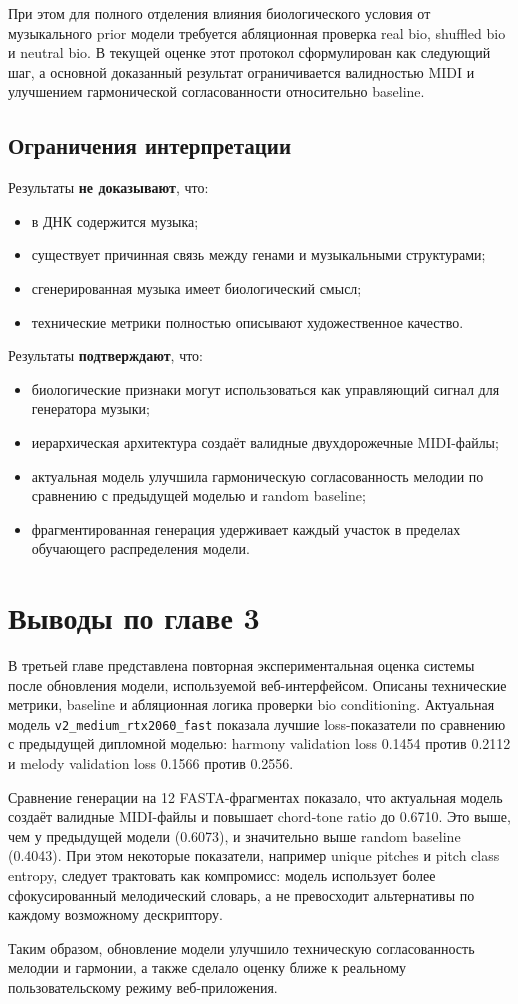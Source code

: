 При этом для полного отделения влияния биологического условия от музыкального prior модели требуется абляционная проверка real bio, shuffled bio и neutral bio. В текущей оценке этот протокол сформулирован как следующий шаг, а основной доказанный результат ограничивается валидностью MIDI и улучшением гармонической согласованности относительно baseline.

\subsection{Ограничения интерпретации}

Результаты \textbf{не доказывают}, что:
\begin{itemize}
\item в ДНК содержится музыка;
\item существует причинная связь между генами и музыкальными структурами;
\item сгенерированная музыка имеет биологический смысл;
\item технические метрики полностью описывают художественное качество.
\end{itemize}

Результаты \textbf{подтверждают}, что:
\begin{itemize}
\item биологические признаки могут использоваться как управляющий сигнал для генератора музыки;
\item иерархическая архитектура создаёт валидные двухдорожечные MIDI-файлы;
\item актуальная модель улучшила гармоническую согласованность мелодии по сравнению с предыдущей моделью и random baseline;
\item фрагментированная генерация удерживает каждый участок в пределах обучающего распределения модели.
\end{itemize}

\section*{Выводы по главе 3}

В третьей главе представлена повторная экспериментальная оценка системы после обновления модели, используемой веб-интерфейсом. Описаны технические метрики, baseline и абляционная логика проверки bio conditioning. Актуальная модель \texttt{v2\_medium\_rtx2060\_fast} показала лучшие loss-показатели по сравнению с предыдущей дипломной моделью: harmony validation loss 0.1454 против 0.2112 и melody validation loss 0.1566 против 0.2556.

Сравнение генерации на 12 FASTA-фрагментах показало, что актуальная модель создаёт валидные MIDI-файлы и повышает chord-tone ratio до 0.6710. Это выше, чем у предыдущей модели (0.6073), и значительно выше random baseline (0.4043). При этом некоторые показатели, например unique pitches и pitch class entropy, следует трактовать как компромисс: модель использует более сфокусированный мелодический словарь, а не превосходит альтернативы по каждому возможному дескриптору.

Таким образом, обновление модели улучшило техническую согласованность мелодии и гармонии, а также сделало оценку ближе к реальному пользовательскому режиму веб-приложения.

